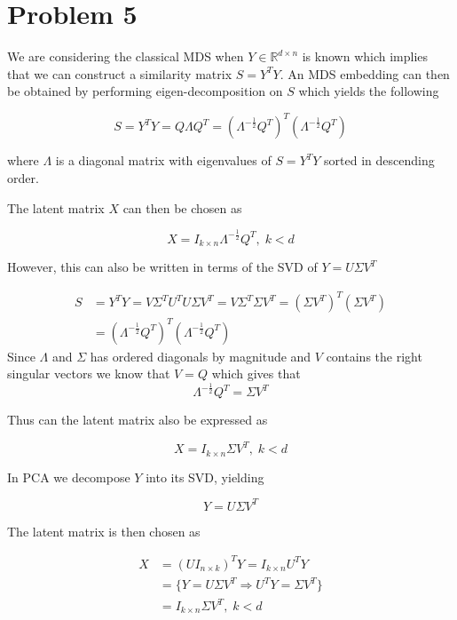 \section*{Problem 5}


We are considering the classical MDS when $Y \in \mathbb{R}^{d \times n}$ is known which implies that we can construct a similarity matrix $S = Y^T Y$. An MDS embedding can then be obtained by performing eigen-decomposition on $S$ which yields the following

\begin{equation}
  S = Y^T Y = Q \Lambda Q^T = (\Lambda^{-\frac{1}{2}}Q^T)^T(\Lambda^{-\frac{1}{2}}Q^T)
\end{equation}

where $\Lambda$ is a diagonal matrix with eigenvalues of $S = Y^T Y$ sorted in descending order.

The latent matrix $X$ can then be chosen as

\begin{equation}
  X = I_{k \times n} \Lambda^{-\frac{1}{2}}Q^T , \; k < d
\end{equation}

However, this can also be written in terms of the SVD of $Y = U \Sigma V^T$

\begin{align}
  S & = Y^T Y = V \Sigma^T U^T U \Sigma V^T = V \Sigma^T \Sigma V^T = (\Sigma V^T)^T(\Sigma V^T) \\
  & = (\Lambda^{-\frac{1}{2}}Q^T)^T(\Lambda^{-\frac{1}{2}}Q^T)
\end{align}
Since $\Lambda$ and $\Sigma$ has ordered diagonals by magnitude and $V$ contains the right singular vectors we know that $V = Q$ which gives that
\begin{equation}
  \Lambda^{-\frac{1}{2}}Q^T = \Sigma V^T
\end{equation}

Thus can the latent matrix also be expressed as

\begin{equation}
  X = I_{k \times n} \Sigma V^T , \; k < d
  \label{5_1}
\end{equation}

In PCA we decompose $Y$ into its SVD, yielding

\begin{equation}
  Y = U \Sigma V^T
\end{equation}

The latent matrix is then chosen as

\begin{align}
  X & = (U I_{n \times k})^T Y = I_{k \times n} U^T Y \\
  & =  \bigg\{Y = U \Sigma V^T \Rightarrow U^T Y = \Sigma V^T \bigg\} \\
  & = I_{k \times n} \Sigma V^T , \; k < d
  \label{5_2}
\end{align}

